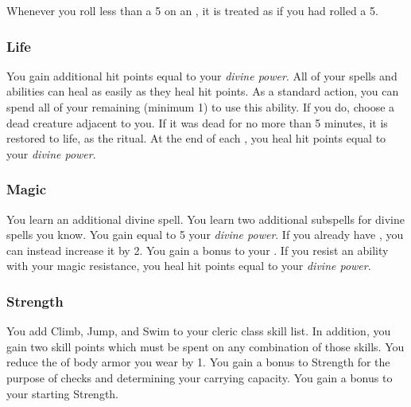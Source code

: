             Whenever you roll less than a 5 on an , it is treated as if you had rolled a 5.

        \subsubsection{Life}
             You gain additional hit points equal to your \textit{divine power}.
             All of your  spells and abilities can heal  as easily as they heal hit points.
             As a standard action, you can spend all of your remaining  (minimum 1) to use this ability.
            If you do, choose a dead creature adjacent to you.
            If it was dead for no more than 5 minutes, it is restored to life, as the  ritual.
             At the end of each , you heal hit points equal to your \textit{divine power}.

        \subsubsection{Magic}
             You learn an additional divine spell.
             You learn two additional subspells for divine spells you know.
             You gain  equal to 5 \add your \textit{divine power}.
            If you already have , you can instead increase it by 2.
             You gain a  bonus to your .
            If you resist an ability with your magic resistance, you heal hit points equal to your \textit{divine power}.

        \subsubsection{Strength}
             You add Climb, Jump, and Swim to your cleric class skill list.
            In addition, you gain two skill points which must be spent on any combination of those skills.
             You reduce the  of body armor you wear by 1.
             You gain a  bonus to Strength for the purpose of checks and determining your carrying capacity.
             You gain a  bonus to your starting Strength.

